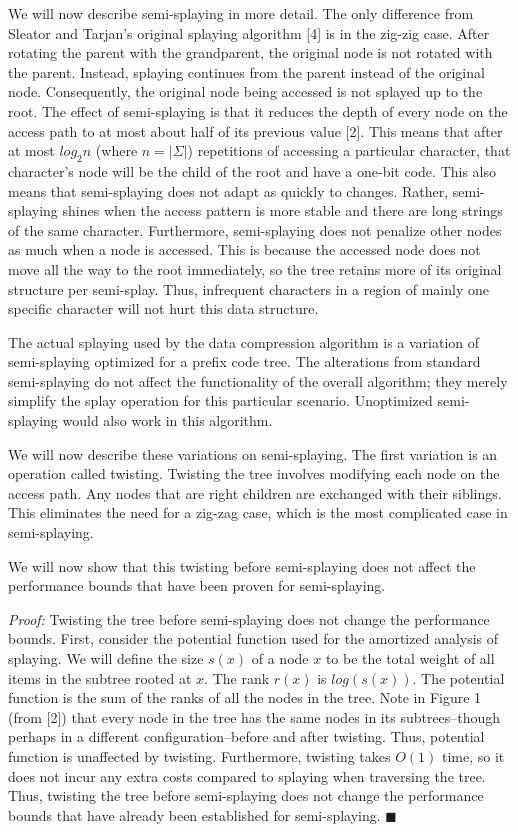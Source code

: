 \documentclass[twoside]{article}
\begin{document}
\begin{multicols}{2}
We will now describe semi-splaying in more detail. The only difference from Sleator and Tarjan's original splaying algorithm [4] is in the zig-zig case. After rotating the parent with the grandparent, the original node is not rotated with the parent. Instead, splaying continues from the parent instead of the original node. Consequently, the original node being accessed is not splayed up to the root. The effect of semi-splaying is that it reduces the depth of every node on the access path to at most about half of its previous value [2]. This means that after at most $log_2n$ (where $n = |\Sigma|$) repetitions of accessing a particular character, that character's node will be the child of the root and have a one-bit code. This also means that semi-splaying does not adapt as quickly to changes. Rather, semi-splaying shines when the access pattern is more stable and there are long strings of the same character. Furthermore, semi-splaying does not penalize other nodes as much when a node is accessed. This is because the accessed node does not move all the way to the root immediately, so the tree retains more of its original structure per semi-splay. Thus, infrequent characters in a region of mainly one specific character will not hurt this data structure. 

The actual splaying used by the data compression algorithm is a variation of semi-splaying optimized for a prefix code tree. The alterations from standard semi-splaying do not affect the functionality of the overall algorithm; they merely simplify the splay operation for this particular scenario. Unoptimized semi-splaying would also work in this algorithm.

We will now describe these variations on semi-splaying. The first variation is an operation called twisting. Twisting the tree involves modifying each node on the access path. Any nodes that are right children are exchanged with their siblings. This eliminates the need for a zig-zag case, which is the most complicated case in semi-splaying.

We will now show that this twisting before semi-splaying does not affect the performance bounds that have been proven for semi-splaying. 

\textit{Proof:} Twisting the tree before semi-splaying does not change the performance bounds. First, consider the potential function used for the amortized analysis of splaying. We will define the size $s(x)$ of a node $x$ to be the total weight of all items in the subtree rooted at $x$. The rank $r(x)$ is $log(s(x))$. The potential function is the sum of the ranks of all the nodes in the tree. Note in Figure 1 (from [2]) that every node in the tree has the same nodes in its subtrees--though perhaps in a different configuration--before and after twisting. Thus, potential function is unaffected by twisting. Furthermore, twisting takes $O(1)$ time, so it does not incur any extra costs compared to splaying when traversing the tree. Thus, twisting the tree before semi-splaying does not change the performance bounds that have already been established for semi-splaying. $\blacksquare$


\end{multicols}
\end{document}
